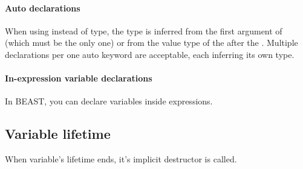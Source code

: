 \paragraph{Auto declarations}
When using  instead of type, the type is inferred from the first argument of  (which must be the only one) or from the value type of the  after the \kwd{=}. Multiple declarations per one auto keyword are acceptable, each inferring its own type.

\paragraph{In-expression variable declarations}
In BEAST, you can declare variables inside expressions.

\subsection{Variable lifetime}
When variable's lifetime ends, it's implicit destructor  is called.

